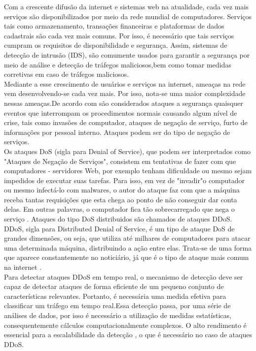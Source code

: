 \documentclass[conference]{IEEEtran}
\begin{document}
	
	Com a crescente difusão da internet e sistemas web na atualidade, cada vez mais
	serviços são disponibilizados por meio da rede mundial de computadores. Serviços tais como armazenamento, transações financeiras e plataformas de dados cadastrais são cada vez mais comuns. Por isso, é necessário que tais serviços cumpram os requisitos de disponibilidade e segurança. Assim, sistemas de detecção de intrusão (IDS), são comumente usados para garantir a segurança por meio de análise e detecção de tráfegos maliciosos,bem como tomar medidas corretivas em caso de tráfegos maliciosos.  \\ 
	Mediante a esse crescimento de usuários e serviços na internet, ameaças na rede vem
	desenvolvendo-se cada vez mais. Por isso, nota-se uma maior complexidade nessas ameaças.De acordo com \cite{b1} são considerados ataques a segurança quaisquer
	eventos que interrompam os procedimentos normais causando algum nível de crise, tais
	como invasões de computador, ataques de negação de serviço, furto de informações por
	pessoal interno. Ataques podem ser do tipo de negação de serviços. \\
	Os ataques DoS (sigla para Denial of Service), que podem ser interpretados como
	"Ataques de Negação de Serviços", consistem em tentativas de fazer com que computadores - servidores Web, por exemplo tenham dificuldade ou mesmo sejam impedidos de executar suas tarefas. Para isso, em vez de "invadir"o computador ou mesmo infectá-lo com malwares, o autor do ataque faz com que a máquina receba tantas requisições que esta chega ao ponto de não conseguir dar conta delas. Em outras palavras, o computador fica tão sobrecarregado que nega o serviço \cite{b2}. Ataques do tipo DoS distribuidos são chamados de ataques DDoS.\\ DDoS, sigla para Distributed Denial of Service, é um tipo de ataque DoS de grandes dimensões, ou seja, que utiliza até milhares de computadores para atacar uma determinada máquina, distribuindo a ação entre elas. Trata-se de uma forma que aparece constantemente no noticiário, já que é o tipo de ataque mais comum na internet \cite{b3}.\\ Para detectar ataques DDoS em tempo real, o mecanismo de detecção deve ser
	capaz de detectar ataques de forma eficiente de um pequeno conjunto de características relevantes. Portanto, é necessária uma medida efetiva para classificar um tráfego em tempo real.Essa detecção passa, por uma série de análises de dados, por isso é necessário a utilização de medidas estatísticas, consequentemente cálculos computacionalmente complexos. O alto rendimento é essencial para a escalabilidade da detecção , o que é necessário no caso de ataques DDoS.\\
\end{document}

